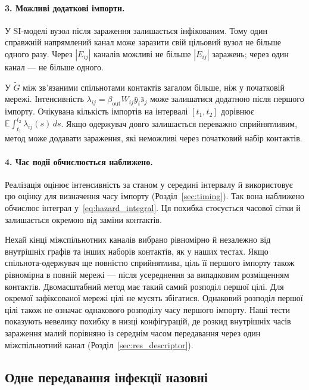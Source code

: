 \documentclass[a4paper,fleqn]{cas-sc}
\newcommand{\ibar}{\bar{y}}
\newcommand{\sbar}{\bar{s}}
\begin{document}
\paragraph{3. Можливі додаткові імпорти.}
У SI-моделі вузол після зараження залишається інфікованим. Тому один справжній напрямлений канал може заразити свій цільовий вузол не більше одного разу. Через $|E_{ij}|$ каналів можливі не більше $|E_{ij}|$ заражень; через один канал --- не більше одного.
\par У $\tilde G$ між зв’язаними спільнотами контактів загалом більше, ніж у початковій мережі. Інтенсивність $\lambda_{ij}=\beta_{\mathrm{out}}W_{ij}\ibar_i\sbar_j$ може залишатися додатною після першого імпорту. Очікувана кількість імпортів на інтервалі $[t_1,t_2]$ дорівнює $\mathbb{E}\int_{t_1}^{t_2}\lambda_{ij}(s)\,ds$. Якщо одержувач довго залишається переважно сприйнятливим, метод може додавати зараження, які неможливі через початковий набір контактів.

\paragraph{4. Час події обчислюється наближено.}
Реалізація оцінює інтенсивність за станом у середині інтервалу й використовує цю оцінку для визначення часу імпорту (Розділ~\ref{sec:timing}). Так вона наближено обчислює інтеграл у~\eqref{eq:hazard_integral}. Ця похибка стосується часової сітки й залишається окремою від заміни контактів.

\begin{remark}
\label{rem:placement}
Нехай кінці міжспільнотних каналів вибрано рівномірно й незалежно від внутрішніх графів та інших наборів контактів, як у наших тестах. Якщо спільнота-одержувач ще повністю сприйнятлива, ціль її першого імпорту також рівномірна в повній мережі --- після усереднення за випадковим розміщенням контактів. Двомасштабний метод має такий самий розподіл першої цілі. Для окремої зафіксованої мережі цілі не мусять збігатися. Однаковий розподіл першої цілі також не означає однакового розподілу часу першого імпорту. Наші тести показують невелику похибку в низці конфігурацій, де розкид внутрішніх часів зараження малий порівняно
із середнім часом передавання через один міжспільнотний
канал (Розділ~\ref*{sec:res_descriptor}).
\end{remark}


\subsection{Одне передавання інфекції назовні}
\label{sec:single_export}
\end{document}
